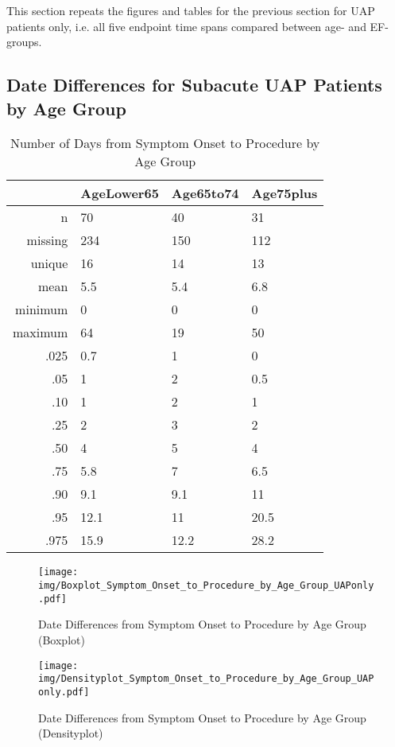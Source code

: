 \documentclass[a4paper]{report}
\begin{document}
\begin{itemize}
{This section repeats the figures and tables for the previous section for UAP patients only, i.e. all five endpoint time spans compared between age- and EF-groups.

\subsection{Date Differences for Subacute UAP Patients by Age Group}

\begin{table}[ht]
\centering
\begin{tabular}{rlll}
  \toprule
 & AgeLower65 & Age65to74 & Age75plus \\ 
  \midrule
n & 70 & 40 & 31 \\ 
  missing & 234 & 150 & 112 \\ 
  unique & 16 & 14 & 13 \\ 
  mean & 5.5 & 5.4 & 6.8 \\ 
  minimum & 0 & 0 & 0 \\ 
  maximum & 64 & 19 & 50 \\ 
  .025 & 0.7 & 1 & 0 \\ 
  .05 & 1 & 2 & 0.5 \\ 
  .10 & 1 & 2 & 1 \\ 
  .25 & 2 & 3 & 2 \\ 
  .50 & 4 & 5 & 4 \\ 
  .75 & 5.8 & 7 & 6.5 \\ 
  .90 & 9.1 & 9.1 & 11 \\ 
  .95 & 12.1 & 11 & 20.5 \\ 
  .975 & 15.9 & 12.2 & 28.2 \\ 
   \bottomrule
\end{tabular}
\caption{Number of Days from Symptom Onset to Procedure by Age Group} 
\end{table}
\begin{figure}
  \centering
  \caption{Date Differences from Symptom Onset to Procedure by Age Group (Boxplot)}
  \label{Boxplot: Date Differences from Symptom Onset to Procedure by Age Group}
\texttt{[image: img/Boxplot\_Symptom\_Onset\_to\_Procedure\_by\_Age\_Group\_UAPonly.pdf]}\end{figure}


\begin{figure}
  \centering
  \caption{Date Differences from Symptom Onset to Procedure by Age Group (Densityplot)}
  \label{Density: Date Differences from Symptom Onset to Procedure by Age Group}
\texttt{[image: img/Densityplot\_Symptom\_Onset\_to\_Procedure\_by\_Age\_Group\_UAPonly.pdf]}\end{figure}


}
\end{itemize}
\end{document}
